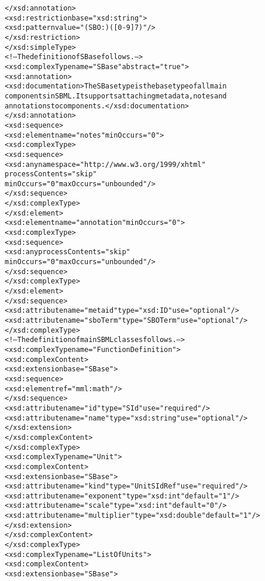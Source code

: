 \begin{alltt}
        </xsd:annotation>
        <xsd:restriction base="xsd:string">
            <xsd:pattern value="(SBO:)([0-9]{7})"/>
        </xsd:restriction>
    </xsd:simpleType>
    <!--The definition of SBase follows.-->
    <xsd:complexType name="SBase" abstract="true">
        <xsd:annotation>
            <xsd:documentation>The SBase type is the base type of all main
            components in SBML.  It supports attaching metadata, notes and
            annotations to components.</xsd:documentation>
        </xsd:annotation>
        <xsd:sequence>
            <xsd:element name="notes" minOccurs="0">
                <xsd:complexType>
                    <xsd:sequence>
                        <xsd:any namespace="http://www.w3.org/1999/xhtml" 
                                 processContents="skip"
                                 minOccurs="0" maxOccurs="unbounded"/>
                    </xsd:sequence>
                </xsd:complexType>
            </xsd:element>
            <xsd:element name="annotation" minOccurs="0">
                <xsd:complexType>
                    <xsd:sequence>
                        <xsd:any processContents="skip" 
                                 minOccurs="0" maxOccurs="unbounded"/>
                    </xsd:sequence>
                </xsd:complexType>
            </xsd:element>
        </xsd:sequence>
        <xsd:attribute name="metaid" type="xsd:ID" use="optional"/>
        <xsd:attribute name="sboTerm" type="SBOTerm" use="optional"/>
    </xsd:complexType>
    <!--The definition of main SBML classes follows.-->
    <xsd:complexType name="FunctionDefinition">
        <xsd:complexContent>
            <xsd:extension base="SBase">
                <xsd:sequence>
                    <xsd:element ref="mml:math"/>
                </xsd:sequence>
                <xsd:attribute name="id" type="SId" use="required"/>
                <xsd:attribute name="name" type="xsd:string" use="optional"/>
            </xsd:extension>
        </xsd:complexContent>
    </xsd:complexType>
    <xsd:complexType name="Unit">
        <xsd:complexContent>
            <xsd:extension base="SBase">
                <xsd:attribute name="kind" type="UnitSIdRef" use="required"/>
                <xsd:attribute name="exponent" type="xsd:int" default="1"/>
                <xsd:attribute name="scale" type="xsd:int" default="0"/>
                <xsd:attribute name="multiplier" type="xsd:double" default="1"/>
            </xsd:extension>
        </xsd:complexContent>
    </xsd:complexType>
    <xsd:complexType name="ListOfUnits">
        <xsd:complexContent>
            <xsd:extension base="SBase">

\end{alltt}
